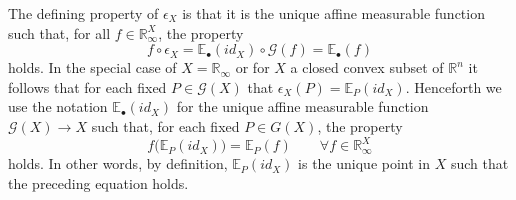 \documentclass[11pt]{amsart}    %
\newcommand{\G}{\mathcal{G}}
\begin{document}
The defining property of $\epsilon_X$ is that it is the unique affine measurable function such that, for all $f \in \mathbb{R}_{\infty}^X$, the property
$$ 
f \circ \epsilon_X = \mathbb{E}_{\bullet}(id_X) \circ \G(f) = \mathbb{E}_{\bullet}(f)
$$
holds. In the special case of $X = \mathbb{R}_{\infty}$ or  for $X$ a closed convex subset of $\mathbb{R}^n$  it follows that for each fixed $P \in \G(X)$ that $\epsilon_X(P) = \mathbb{E}_{P}(id_X)$. Henceforth we use the notation $\mathbb{E}_{\bullet}(id_X)$ for the unique affine measurable function $\G(X) \rightarrow X$ such that, for each fixed $P \in G(X)$,  the property
$$
f \big( \mathbb{E}_P(id_X)\big) = \mathbb{E}_P(f) \quad \quad \forall f \in \mathbb{R}_{\infty}^X
$$
holds. In other words, by definition,  $\mathbb{E}_P(id_X)$ is the unique point in $X$ such that the preceding equation holds.
\end{document}
